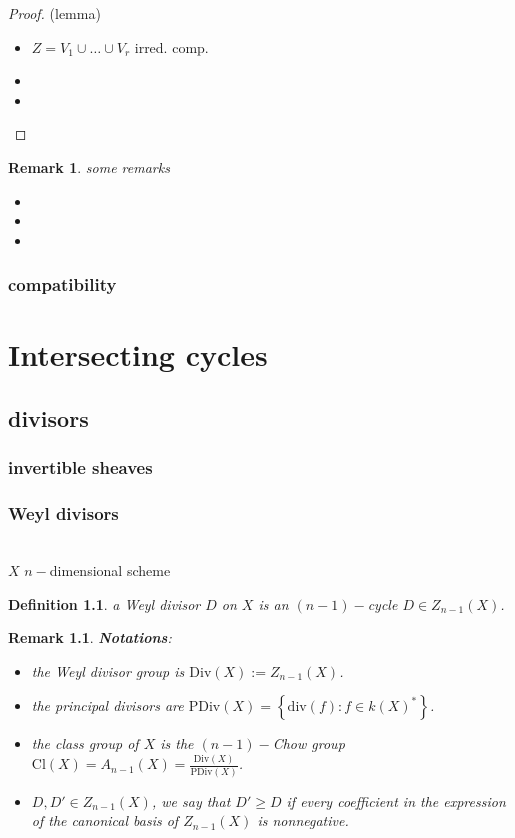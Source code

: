 \documentclass[oneside,a4paper,11pt]{amsbook}
\theoremstyle{pl}
\theoremstyle{df}
\newtheorem*{dfn}{Definition}
\theoremstyle{rm}
\newtheorem{rmk}{Remark}[chapter]
\newcommand{\nline}{
~\\
}%
\newcommand{\pa}[1]{
\left(#1\right)
}
\newcommand{\ga}[1]{
\left\{#1\right\}
}
\newcommand{\dv}[1]{
\text{div}\pa{#1}
}
\begin{document}
\begin{proof}(lemma)
\begin{itemize}
 \item{$Z=V_1\cup\dots\cup V_r$ irred. comp.}
 \item{}
 \item{}
\end{itemize}
\end{proof}

\begin{rmk}
some remarks
\begin{itemize}
 \item{}
 \item{}
 \item{}
\end{itemize}
\end{rmk}

\subsection{compatibility}  

\chapter{Intersecting cycles}
\section{divisors}

\subsection{invertible sheaves}

\subsection{Weyl divisors}
\nline
$X$ $n-$dimensional scheme

\begin{dfn}
a \emph{Weyl divisor} $D$ on $X$ is an $(n-1)-$cycle $D\in Z_{n-1}(X)$.
\end{dfn}

\begin{rmk}
\textbf{Notations}:
\begin{itemize}
\item{the \emph{Weyl divisor group} is $\text{Div}(X):=Z_{n-1}(X)$.}
\item{the \emph{principal divisors} are $\text{PDiv}(X)=\ga{\dv{f}:f\in k(X)^*}$.}
\item{the \emph{class group} of $X$ is the $(n-1)-$\emph{Chow group} $\text{Cl}(X)=A_{n-1}(X)=\frac{\text{Div}(X)}{\text{PDiv}(X)}$.}
\item{$D,D'\in Z_{n-1}(X)$, we say that $D'\ge D$ if every coefficient in the expression of the canonical basis of $Z_{n-1}(X)$ is nonnegative.}
\end{itemize}
\end{rmk}
\end{document}
